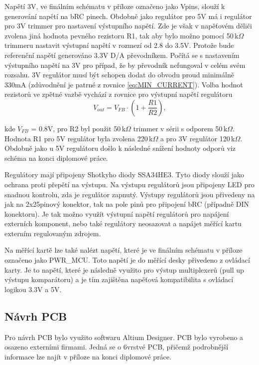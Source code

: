 Napětí 3V, ve finálním schématu v příloze označeno jako Vpins, slouží k generování napětí na bRC pinech. Obdobně jako regulátor pro 5V má i regulátor pro 3V trimmer pro
nastavení výstupního napětí. Zde je však v napěťovém děliči zvolena jiná hodnota pevného rezistoru R1, tak aby
bylo možno pomocí 50\,k$\Omega$ trimmeru nastavit výstupní napětí v rozmezí od 2.8 do 3.5V.
Protože bude referenční napětí generováno 3.3V D/A převodníkem. Počítá se s nastavením výstupního napětí na 3V pro 
případ, že by převodník nefungoval v celém svém rozsahu. 3V regulátor musí být schopen dodat do obvodu proud minimálně
330mA (zdůvodnění je patrné z rovnice \ref{eq:MIN_CURRENT}).
Volba hodnot rezistorů ve zpětné vazbě vychází z rovnice pro výstupní napětí regulátoru
\begin{equation}
V_{out} = V_{FB}  \cdot (1 + \frac{R1}{R2}),
\end{equation}

\noindent kde $V_{FB}$ = 0.8V, pro R2 byl použit 50\,k$\Omega$ trimmer v sérii s odporem 50\,k$\Omega$.
Hodnota R1 pro 5V regulátor byla zvolena
220\,k$\Omega$ a pro 3V regulátor 120\,k$\Omega$. Obdobně jako u 5V regulátoru došlo k následné snížení hodnoty odporů viz schéma na konci diplomové práce.\par

Regulátory mají připojeny Shotkyho diody SSA34HE3. Tyto diody slouží jako ochrana proti přepětí na výstupu.
Na výstupu regulátorů jsou připojeny LED pro snadnou kontrolu, zda je regulátor zapnutý.
Výstupy regulátorů jsou přivedeny na jak na 2x25pinový konektor, tak na pole pinů pro připojení bRC (případně DIN konektoru).
Je tak možno využít výstupní napětí regulátorů pro napájení externích komponent, nebo
také regulátory neosazovat a napájet měřící kartu externím regulovaným zdrojem.\par

Na měřící kartě lze také nalézt napětí, které je ve finálním schématu v příloze označeno jako PWR\_MCU.
Toto napětí je do měřící desky přivedeno z ovládací karty. Je to napětí, které je následně využito
pro výstup multiplexerů (pull up výstupu komparátoru) a je tím zajištěna napěťová kompatibilita s ovládací logikou 3.3V a 5V.


\subsection{Návrh PCB}
Pro návrh PCB bylo využito softwaru Altium Designer. PCB bylo vyrobeno a osazeno externími firmami. 
Jedná se o 6vrstvé PCB, přičemž podrobnější informace lze najít v příloze na konci diplomové práce.


